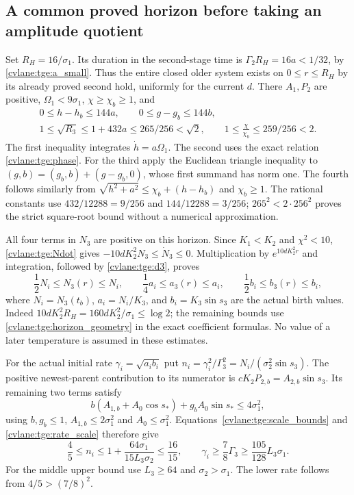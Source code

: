 \subsection{A common proved horizon before taking an amplitude quotient}

Set $R_H=16/\sigma_1$. Its duration in the second-stage time is
$\Gamma_2R_H=16a<1/32$, by \eqref{cvlane:tge:a_small}.
Thus the entire closed older system exists on $0\leq r\leq R_H$
by its already proved second hold, uniformly for the current $d$.
There $A_1,P_2$ are positive, $\Omega_1<9\sigma_1$,
$\chi\geq\chi_b\geq1$, and
\begin{equation}\label{cvlane:tge:horizon_geometry}
\begin{gathered}
 0\leq h-h_b\leq144a,\qquad
 0\leq g-g_b\leq144b,\\
 1\leq\sqrt{R_3}\leq1+432a\leq265/256<\sqrt2,
 \qquad1\leq\frac{\chi}{\chi_b}\leq259/256<2.
\end{gathered}
\end{equation}
The first inequality integrates $\dot h=a\Omega_1$.
The second uses the exact relation \eqref{cvlane:tge:phase}.
For the third apply the Euclidean triangle inequality to
$(g,b)=(g_b,b)+(g-g_b,0)$, whose first summand has norm one.
The fourth follows similarly from
$\sqrt{h^2+a^2}\leq\chi_b+(h-h_b)$ and $\chi_b\geq1$.
The rational constants use $432/12288=9/256$ and
$144/12288=3/256$; $265^2<2\cdot256^2$ proves the strict square-root
bound without a numerical approximation.

All four terms in $N_3$ are positive on this horizon.
Since $K_1<K_2$ and $\chi^2<10$, \eqref{cvlane:tge:Ndot} gives
$-10dK_2^2N_3\leq\dot N_3\leq0$.
Multiplication by $e^{10dK_2^2r}$ and integration, followed by
\eqref{cvlane:tge:d3}, proves
\begin{equation}\label{cvlane:tge:coeffbox}
 \frac12N_i\leq N_3(r)\leq N_i,\qquad
 \frac14a_i\leq a_3(r)\leq a_i,\qquad
 \frac12b_i\leq b_3(r)\leq b_i,
\end{equation}
where $N_i=N_3(t_b)$, $a_i=N_i/K_3$, and
$b_i=K_3\sin s_3$ are the actual birth values.
Indeed $10dK_2^2R_H=160dK_2^2/\sigma_1\leq\log2$;
the remaining bounds use \eqref{cvlane:tge:horizon_geometry} in the exact
coefficient formulas. No value of a later temperature is assumed
in these estimates.

For the actual initial rate $\gamma_i=\sqrt{a_ib_i}$ put
$n_i=\gamma_i^2/\Gamma_3^2=N_i/(\sigma_2^2\sin s_3)$.
The positive newest-parent contribution to its numerator is
$cK_2P_{2,b}=A_{2,b}\sin s_3$.
Its remaining two terms satisfy
\[
 b(A_{1,b}+A_0\cos s_*)+g_bA_0\sin s_*\leq4\sigma_1^2,
\]
using $b,g_b\leq1$, $A_{1,b}\leq2\sigma_1^2$ and
$A_0\leq\sigma_1^2$.
Equations~\eqref{cvlane:tge:scale_bounds} and \eqref{cvlane:tge:rate_scale}
therefore give
\begin{equation}\label{cvlane:tge:initial_rate}
 \frac45\leq n_i\leq1+\frac{64\sigma_1}{15L_3\sigma_2}
       \leq\frac{16}{15},\qquad
 \gamma_i\geq\frac78\Gamma_3
       \geq\frac{105}{128}L_3\sigma_1.
\end{equation}
For the middle upper bound use $L_3\geq64$ and $\sigma_2>\sigma_1$.
The lower rate follows from $4/5>(7/8)^2$.


